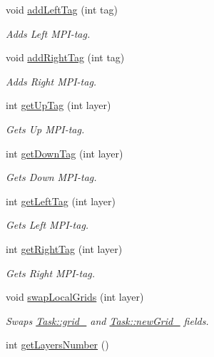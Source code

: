 \begin{DoxyCompactItemize}
void \hyperlink{classTask_ac085d860253115de26dec2065d2b1a24}{add\+Left\+Tag} (int tag)
\begin{DoxyCompactList}\small\item\em Adds Left M\+P\+I-\/tag. \end{DoxyCompactList}\item 
void \hyperlink{classTask_a8bb8d1487b7d71d53791d7754a668be5}{add\+Right\+Tag} (int tag)
\begin{DoxyCompactList}\small\item\em Adds Right M\+P\+I-\/tag. \end{DoxyCompactList}\item 
int \hyperlink{classTask_ac2a99b7b3090c1309f25e7b722fe833f}{get\+Up\+Tag} (int layer)
\begin{DoxyCompactList}\small\item\em Gets Up M\+P\+I-\/tag. \end{DoxyCompactList}\item 
int \hyperlink{classTask_afeee548c3ed873e5b637e90970fdd8de}{get\+Down\+Tag} (int layer)
\begin{DoxyCompactList}\small\item\em Gets Down M\+P\+I-\/tag. \end{DoxyCompactList}\item 
int \hyperlink{classTask_a9e32222b90c43e0e7e4bf7a7dfc48e2e}{get\+Left\+Tag} (int layer)
\begin{DoxyCompactList}\small\item\em Gets Left M\+P\+I-\/tag. \end{DoxyCompactList}\item 
int \hyperlink{classTask_ae0ee5c9cde6f10c66c2241c4b794f38f}{get\+Right\+Tag} (int layer)
\begin{DoxyCompactList}\small\item\em Gets Right M\+P\+I-\/tag. \end{DoxyCompactList}\item 
void \hyperlink{classTask_a2500cb730f60348d051a1eace6579e2b}{swap\+Local\+Grids} (int layer)
\begin{DoxyCompactList}\small\item\em Swaps \hyperlink{classTask_ab7117d32273662d2695f80f5ea245331}{Task\+::grid\+\_\+} and \hyperlink{classTask_a554be6d55c1e3204cf946d9c0faf97c3}{Task\+::new\+Grid\+\_\+} fields. \end{DoxyCompactList}\item 
int \hyperlink{classTask_abb70929ab1b5c3bd6356501a876fd131}{get\+Layers\+Number} ()\hypertarget{classTask_abb70929ab1b5c3bd6356501a876fd131}{}\label{classTask_abb70929ab1b5c3bd6356501a876fd131}


\end{DoxyCompactItemize}
